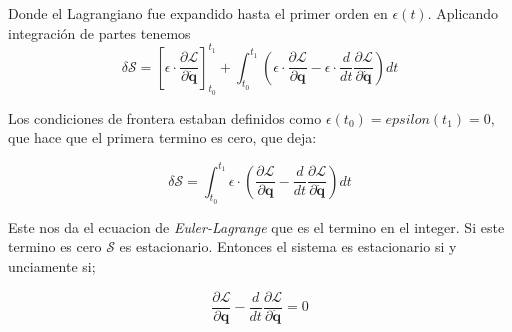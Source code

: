 \documentclass[11pt]{article}
\begin{document}
Donde el Lagrangiano fue expandido hasta el primer orden en $\epsilon (t)$. %
Aplicando integraci\'on de partes tenemos 
\begin{equation}
	\delta  \mathcal{S}= \left [ 
		\epsilon \cdot \frac {\partial  \mathcal{L}} {\partial \dot{\boldsymbol{q}}} \right ]_{t_0}^{t_1} +
		\int_{t_0}^{t_1} \left ( \epsilon \cdot \frac {\partial  \mathcal{L}} {\partial \boldsymbol{q}}-\epsilon \cdot \frac {d} {dt} \frac {\partial  \mathcal{L}} {\partial \dot{\boldsymbol{q}}} \right ) dt
\end{equation}
 
 Los condiciones de frontera estaban definidos como $\epsilon(t_0)=epsilon(t_1)=0$, que hace que el primera termino es cero, que deja:
 
\begin{equation}
	\delta  \mathcal{S}=\int_{t_0}^{t_1} \epsilon \cdot 
	\left (  
		\frac {\partial  \mathcal{L}} {\partial \boldsymbol{q}}- \frac {d} {dt} \frac {\partial  \mathcal{L}} {\partial \dot{\boldsymbol{q}}}
	\right ) dt
\end{equation}

Este nos da el ecuacion de \emph{Euler-Lagrange} que es el termino en el integer. Si este termino es cero $ \mathcal{S}$ es estacionario. Entonces el sistema es estacionario si y unciamente si;

\begin{equation}
	\frac {\partial  \mathcal{L}} {\partial \boldsymbol{q}}- \frac {d} {dt} \frac {\partial  \mathcal{L}} {\partial \dot{\boldsymbol{q}}}=0
\end{equation}
\end{document}
